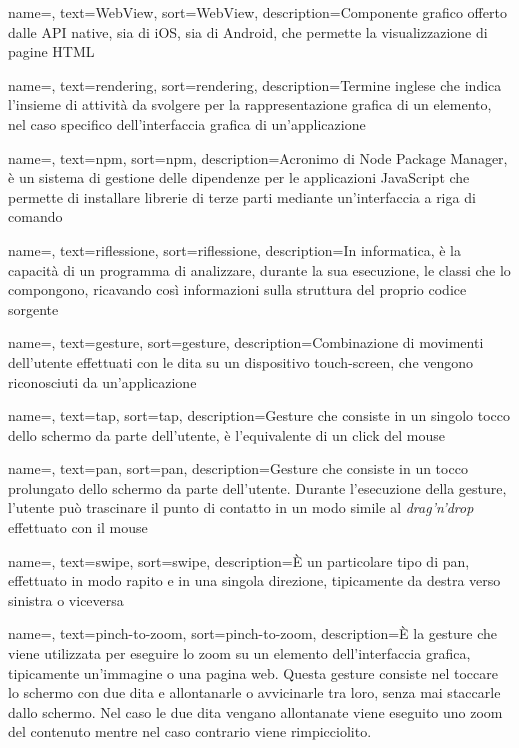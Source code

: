 {
    name=,
    text=WebView,
    sort=WebView,
    description={Componente grafico offerto dalle API native, sia di iOS, sia di Android, che permette la visualizzazione di pagine HTML}
}

{
    name=,
    text=rendering,
    sort=rendering,
    description={Termine inglese che indica l'insieme di attività da svolgere per la rappresentazione grafica di un elemento, nel caso specifico dell'interfaccia grafica di un'applicazione}
}

{
    name=,
    text=npm,
    sort=npm,
    description={Acronimo di Node Package Manager, è un sistema di gestione delle dipendenze per le applicazioni JavaScript che permette di installare librerie di terze parti mediante un'interfaccia a riga di comando}
}

{
    name=,
    text=riflessione,
    sort=riflessione,
    description={In informatica, è la capacità di un programma di analizzare, durante la sua esecuzione, le classi che lo compongono, ricavando così informazioni sulla struttura del proprio codice sorgente}
}
    
{
    name=,
    text=gesture,
    sort=gesture,
    description={Combinazione di movimenti dell'utente effettuati con le dita su un dispositivo touch-screen, che vengono riconosciuti da un'applicazione}
}

{
    name=,
    text=tap,
    sort=tap,
    description={Gesture che consiste in un singolo tocco dello schermo da parte dell'utente, è l'equivalente di un click del mouse}
}

{
    name=,
    text=pan,
    sort=pan,
    description={Gesture che consiste in un tocco prolungato dello schermo da parte dell'utente. Durante l'esecuzione della gesture, l'utente può trascinare il punto di contatto in un modo simile al \textit{drag'n'drop} effettuato con il mouse}
}

{
    name=,
    text=swipe,
    sort=swipe,
    description={\`E un particolare tipo di pan, effettuato in modo rapito e in una singola direzione, tipicamente da destra verso sinistra o viceversa}
}

{
    name=,
    text=pinch-to-zoom,
    sort=pinch-to-zoom,
    description={\`E la gesture che viene utilizzata per eseguire lo zoom su un elemento dell'interfaccia grafica, tipicamente un'immagine o una pagina web. Questa gesture consiste nel toccare lo schermo con due dita e allontanarle o avvicinarle tra loro, senza mai staccarle dallo schermo. Nel caso le due dita vengano allontanate viene eseguito uno zoom del contenuto mentre nel caso contrario viene rimpicciolito.}
}

